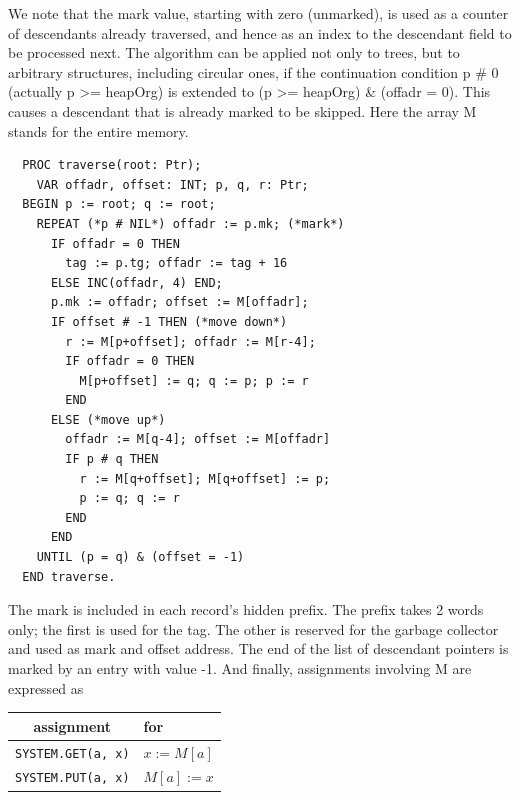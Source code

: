 We note that the mark value, starting with zero (unmarked), is used as a counter of descendants
already traversed, and hence as an index to the descendant field to be processed next. The
algorithm can be applied not only to trees, but to arbitrary structures, including circular ones, if the
continuation condition p \# 0 (actually p >= heapOrg) is extended to (p >= heapOrg) \& (offadr = 0).
This causes a descendant that is already marked to be skipped. Here the array M stands for the
entire memory.
\begin{verbatim}
  PROC traverse(root: Ptr);
    VAR offadr, offset: INT; p, q, r: Ptr;
  BEGIN p := root; q := root;
    REPEAT (*p # NIL*) offadr := p.mk; (*mark*)
      IF offadr = 0 THEN
        tag := p.tg; offadr := tag + 16
      ELSE INC(offadr, 4) END;
      p.mk := offadr; offset := M[offadr];
      IF offset # -1 THEN (*move down*)
        r := M[p+offset]; offadr := M[r-4];
        IF offadr = 0 THEN
          M[p+offset] := q; q := p; p := r
        END
      ELSE (*move up*)
        offadr := M[q-4]; offset := M[offadr]
        IF p # q THEN
          r := M[q+offset]; M[q+offset] := p;
          p := q; q := r
        END
      END
    UNTIL (p = q) & (offset = -1)
  END traverse.
\end{verbatim}

The mark is included in each record's hidden prefix. The prefix takes 2 words only; the first is used
for the tag. The other is reserved for the garbage collector and used as mark and offset address.
The end of the list of descendant pointers is marked by an entry with value -1. And finally,
assignments involving M are expressed as
\begin{table}[h!]
  \centering
  \begin{tabular}{c|l}
    assignment & for \\\hline
    \verb|SYSTEM.GET(a, x)| & $x := M[a]$ \\
    \verb|SYSTEM.PUT(a, x)| & $M[a] := x$ \\
  \end{tabular}
\end{table}

